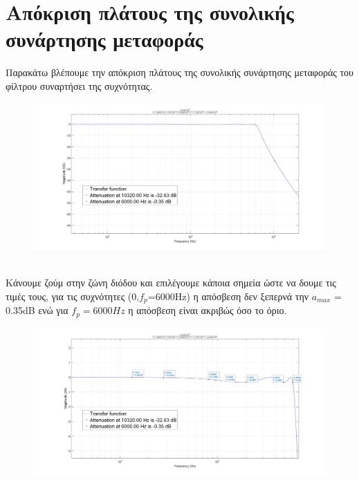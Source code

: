 \documentclass{article}
\begin{document}
{\section*{Aπόκριση πλάτους της συνολικής συνάρτησης μεταφοράς} 
Παρακάτω βλέπουμε την απόκριση πλάτους της συνολικής συνάρτησης μεταφοράς του φίλτρου συναρτήσει της συχνότητας.
\begin{figure}[h!]
\centering
 	\advance\leftskip-1cm
  \includegraphics[width=140mm,scale=1]{apokrisi.jpg}
\end{figure} \\
\normalsize{}
Κάνουμε ζούμ στην ζώνη διόδου και επιλέγουμε κάποια σημεία ώστε να δουμε τις τιμές τους, για τις συχνότητες (0,$f_p$=6000Hz) η απόσβεση δεν ξεπερνά την $a_{max}$ = 0.35dB ενώ για  $f_p=6000Hz$ η απόσβεση είναι ακριβώς όσο το όριο. 
\begin{figure}[h!]
\centering
 	\advance\leftskip-1cm
  \includegraphics[width=140mm,scale=1]{extra.jpg}
\end{figure}
\newpage
}
\end{document}
